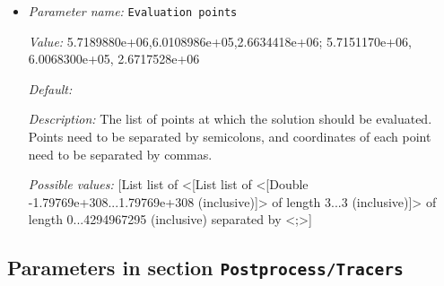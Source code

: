 \begin{itemize}
\item {\it Parameter name:} {\tt Evaluation points}
\label{parameters:Postprocess/Point values/Evaluation points}


{\it Value:} 5.7189880e+06,6.0108986e+05,2.6634418e+06;                            5.7151170e+06, 6.0068300e+05, 2.6717528e+06


{\it Default:} 


{\it Description:} The list of points at which the solution should be evaluated. Points need to be separated by semicolons, and coordinates of each point need to be separated by commas.


{\it Possible values:} [List list of <[List list of <[Double -1.79769e+308...1.79769e+308 (inclusive)]> of length 3...3 (inclusive)]> of length 0...4294967295 (inclusive) separated by <;>]
\end{itemize}

\subsection{Parameters in section \tt Postprocess/Tracers}
\label{parameters:Postprocess/Tracers}

